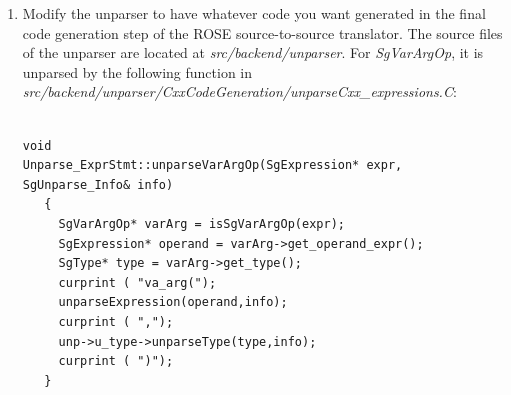 \begin{enumerate}
           Here are the instructions if the new IR node is connected to EDG IR node.
           Modify the EDG/SAGE connection code to have the new IR node built in the
           translation from EDG to SAGE III.  This step often requires a bit of expertise
           in working with the EDG/SAGE connection code. In general, it requires no great
           depth of knowledge of EDG.

           Two source files are usually involved: a)
           \textit{src/frontend/CxxFrontend/EDG\_SAGE\_Connection/sage\_gen\_be.C}
           which converts IL tree to SAGE III AST and is derived from EDG's 
           C++/C-generating back end \textit{cp\_gen\_be.c}; b)
           \textit{sage\_il\_to\_str.C} contains helper functions forming SAGE
           III AST from various EDG IL entries. It is derived from EDG's
           \textit{il\_to\_str.c}.  For the {\em SgVarArgOp} example, the
           following EDG-SAGE connection code is needed in
           \textit{sage\_gen\_be.C}:
{\indent
{\mySmallFontSize
\begin{verbatim}
a_SgExpression_ptr
sage_gen_expr ( an_expr_node_ptr expr, 
                a_boolean need_parens, 
    ...
              )
{
  // ...
  case eok_va_arg:
  {
   sageType = sage_gen_type(expr->type);
   sageLhs = sage_gen_expr_with_parens(operand_1,NULL);
   if (isSgAddressOfOp(sageLhs) != NULL)
     sageLhs = isSgAddressOfOp(sageLhs)->get_operand();
   else
     sageLhs = new SgPointerDerefExp(sageLhs,NULL);
  //....
   result = new SgVarArgOp(sageLhs, sageType);
   goto done_with_operation;
                       }
  }
  //.....

}
\end{verbatim} 
}}

     \item Modify the unparser to have whatever code you want generated in the final
           code generation step of the ROSE source-to-source translator.
           The source files of the unparser are located at
           \textit{src/backend/unparser}. For {\em SgVarArgOp}, it is
           unparsed by the following function in
           \textit{src/backend/unparser/CxxCodeGeneration/unparseCxx\_expressions.C}:

{\indent
{\mySmallFontSize
\begin{verbatim}

void
Unparse_ExprStmt::unparseVarArgOp(SgExpression* expr, SgUnparse_Info& info)
   {
     SgVarArgOp* varArg = isSgVarArgOp(expr);
     SgExpression* operand = varArg->get_operand_expr();
     SgType* type = varArg->get_type();
     curprint ( "va_arg(");
     unparseExpression(operand,info);
     curprint ( ",");
     unp->u_type->unparseType(type,info);
     curprint ( ")");
   }
\end{verbatim} 
}}



\end{enumerate}

